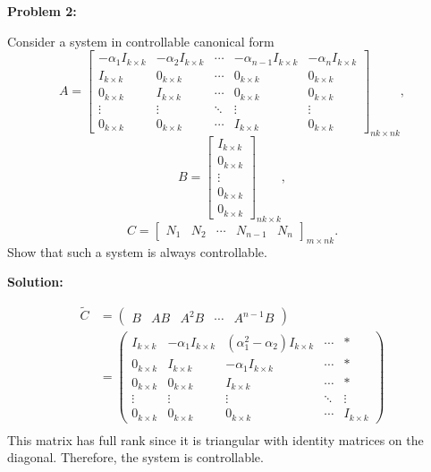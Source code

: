 \documentclass[12pt]{article}
\newenvironment{problem}[1]{
    \textbf{Problem #1:}
}{
    \rmfamily \vspace{1em}
}
\newenvironment{solution}{
    \textbf{Solution:}
    
}{
    
    \vspace{2em}
}
\begin{document}
\newpage

\begin{problem}{2}
Consider a system in controllable canonical form
\[
    A = \begin{bmatrix}
        -\alpha_1 I_{k\times k} & -\alpha_2 I_{k\times k} & \cdots & -\alpha_{n-1} I_{k\times k} & -\alpha_n I_{k\times k} \\
        I_{k\times k} & 0_{k\times k} & \cdots & 0_{k\times k} & 0_{k\times k} \\
        0_{k\times k} & I_{k\times k} & \cdots & 0_{k\times k} & 0_{k\times k} \\
        \vdots & \vdots & \ddots & \vdots & \vdots \\
        0_{k\times k} & 0_{k\times k} & \cdots & I_{k\times k} & 0_{k\times k}
    \end{bmatrix}_{nk\times nk},
\]
\[
    B = \begin{bmatrix}
        I_{k\times k} \\
        0_{k\times k} \\
        \vdots \\
        0_{k\times k} \\
        0_{k\times k}
    \end{bmatrix}_{nk\times k},
\]
\[
    C = \begin{bmatrix}
        N_1 & N_2 & \cdots & N_{n-1} & N_n
    \end{bmatrix}_{m\times nk}.
\]
Show that such a system is always controllable.
\end{problem}

\begin{solution}
    \[
        \begin{aligned}
            \tilde{C} &= \begin{pmatrix}
                B & AB & A^2B & \cdots & A^{n-1}B
            \end{pmatrix} \\
            &= \begin{pmatrix}
                I_{k\times k} & -\alpha_1 I_{k\times k} & (\alpha_1^2 - \alpha_2)I_{k\times k} & \cdots & * \\
                0_{k\times k} & I_{k\times k} & -\alpha_1 I_{k\times k} & \cdots & * \\
                0_{k\times k} & 0_{k\times k} & I_{k\times k} & \cdots & * \\
                \vdots & \vdots & \vdots & \ddots & \vdots \\
                0_{k\times k} & 0_{k\times k} & 0_{k\times k} & \cdots & I_{k\times k}
            \end{pmatrix} \\
        \end{aligned}
    \]
    This matrix has full rank since it is triangular with identity matrices on the diagonal. Therefore, the system is controllable.
\end{solution}
\end{document}
